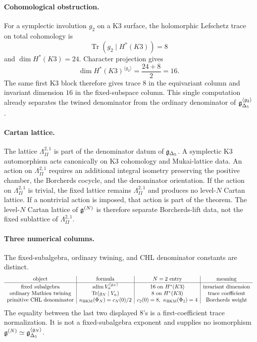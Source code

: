 \paragraph{Cohomological obstruction.}
For a symplectic involution $g_2$ on a K3 surface, the holomorphic
Lefschetz trace on total cohomology is
\[
  \operatorname{Tr}(g_2\mid H^*(K3))=8
\]
and $\dim H^*(K3)=24$. Character projection gives
\[
  \dim H^*(K3)^{\langle g_2\rangle}
  =
  \frac{24+8}{2}=16.
\]
The same first K3 block therefore gives trace $8$ in the equivariant
column and invariant dimension $16$ in the fixed-subspace column. This
single computation already separates the twined denominator from the
ordinary denominator of $\mathfrak{g}_{\Delta_5}^{\langle g_2\rangle}$.

\paragraph{Cartan lattice.}
The lattice $\Lambda^{2,1}_{II}$ is part of the denominator datum of
$\mathfrak{g}_{\Delta_5}$. A symplectic K3 automorphism acts canonically on K3
cohomology and Mukai-lattice data. An action on $\Lambda^{2,1}_{II}$
requires an additional integral isometry preserving the positive
chamber, the Borcherds cocycle, and the denominator orientation. If the
action on $\Lambda^{2,1}_{II}$ is trivial, the fixed lattice remains
$\Lambda^{2,1}_{II}$ and produces no level-$N$ Cartan lattice. If a
nontrivial action is imposed, that action is part of the theorem. The
level-$N$ Cartan lattice of $\mathfrak{g}^{(N)}$ is therefore separate Borcherds-lift
data, not the fixed sublattice of $\Lambda^{2,1}_{II}$.

\paragraph{Three numerical columns.}
The fixed-subalgebra, ordinary twining, and CHL denominator constants
are distinct.
\[
\begin{array}{c|c|c|c}
\text{object} & \text{formula} & N=2\text{ entry} & \text{meaning}\\
\hline
\text{fixed subalgebra}
&
\operatorname{sdim}V_\alpha^{\langle g_N\rangle}
&
16\text{ on }H^*(K3)
&
\text{invariant dimension}
\\
\text{ordinary Mathieu twining}
&
\operatorname{Tr}(g_N\mid V_\alpha)
&
8\text{ on }H^*(K3)
&
\text{trace coefficient}
\\
\text{primitive CHL denominator}
&
\kappa_{\mathrm{BKM}}(\Phi_N)=c_N(0)/2
&
c_2(0)=8,\ \kappa_{\mathrm{BKM}}(\Phi_2)=4
&
\text{Borcherds weight}
\end{array}
\]
The equality between the last two displayed $8$'s is a first-coefficient
trace normalization. It is not a fixed-subalgebra exponent and supplies
no isomorphism $\mathfrak{g}^{(N)}\simeq\mathfrak{g}_{\Delta_5}^{\langle g_N\rangle}$.

